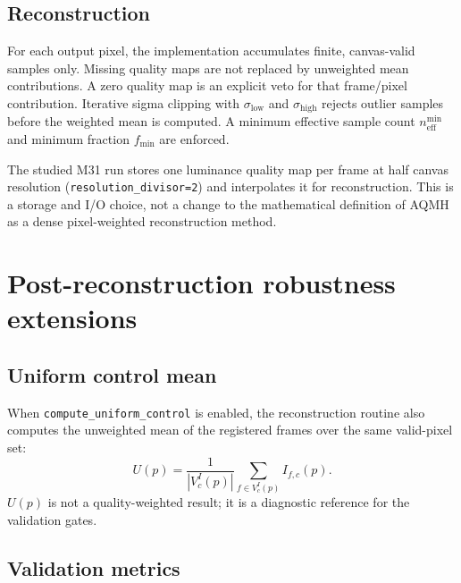 \documentclass[10pt,twocolumn]{article}
\begin{document}
\subsection{Reconstruction}

For each output pixel, the implementation accumulates finite, canvas-valid samples only. Missing
quality maps are not replaced by unweighted mean contributions. A zero quality map is an
explicit veto for that frame/pixel contribution. Iterative sigma clipping with
$\sigma_{\mathrm{low}}$ and $\sigma_{\mathrm{high}}$ rejects outlier samples before the weighted
mean is computed. A minimum effective sample count $n_{\mathrm{eff}}^{\min}$ and minimum fraction
$f_{\min}$ are enforced.

The studied M31 run stores one luminance quality map per frame at half canvas resolution
(\texttt{resolution\_divisor=2}) and interpolates it for reconstruction. This is a storage and
I/O choice, not a change to the mathematical definition of AQMH as a dense pixel-weighted
reconstruction method.

\section{Post-reconstruction robustness extensions}

\subsection{Uniform control mean}

When \texttt{compute\_uniform\_control} is enabled, the reconstruction routine also computes the
unweighted mean of the registered frames over the same valid-pixel set:
\begin{equation}
  U(p) = \frac{1}{|V_c^I(p)|} \sum_{f \in V_c^I(p)} I_{f,c}(p).
\end{equation}
$U(p)$ is not a quality-weighted result; it is a diagnostic reference for the validation gates.

\subsection{Validation metrics}
\end{document}
